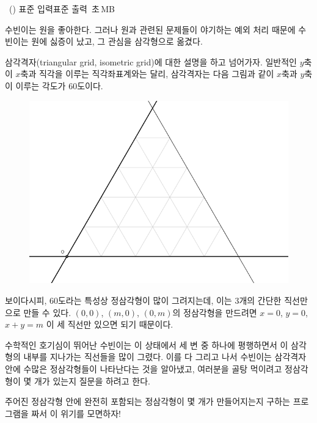 \begin{problem}{\kcpcpprobtriangle\ (\kcpcpprobtriangleshort)}
    {표준 입력}{표준 출력}
    {\kcpcpprobtriangletime\,초}{\kcpcpprobtrianglememory\,MB}{}
    
    수빈이는 원을 좋아한다. 그러나 원과 관련된 문제들이 야기하는 예외 처리 때문에 수빈이는 원에 싫증이 났고, 그 관심을 삼각형으로 옮겼다.
    
    삼각격자(triangular grid, isometric grid)에 대한 설명을 하고 넘어가자. 일반적인 $ y $축이 $ x $축과 직각을 이루는 직각좌표계와는 달리, 삼각격자는 다음 그림과 같이 $ x $축과 $ y $축이 이루는 각도가 60도이다.
    
    \begin{figure}[h]
        \centering
        \includegraphics[height=0.25\textheight]{./problems/triangle-pic1.png}
    \end{figure}

    보이다시피, 60도라는 특성상 정삼각형이 많이 그려지는데, 이는 3개의 간단한 직선만으로 만들 수 있다. $ (0,0) $, $ (m,0) $, $ (0,m) $의 정삼각형을 만드려면 $ x=0 $, $ y=0 $, $ x+y=m $ 이 세 직선만 있으면 되기 때문이다.
    
    수학적인 호기심이 뛰어난 수빈이는 이 상태에서 세 변 중 하나에 평행하면서 이 삼각형의 내부를 지나가는 직선들을 많이 그렸다. 이를 다 그리고 나서 수빈이는 삼각격자 안에 수많은 정삼각형들이 나타난다는 것을 알아냈고, 여러분을 골탕 먹이려고 정삼각형이 몇 개가 있는지 질문을 하려고 한다.
    
    주어진 정삼각형 안에 완전히 포함되는 정삼각형이 몇 개가 만들어지는지 구하는 프로그램을 짜서 이 위기를 모면하자!
    
    \InputFile
    

\end{problem}
